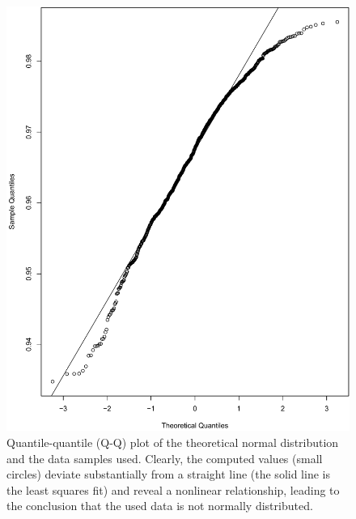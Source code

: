 \begin{figure}[ht]
	\begin{minipage}{0.65\textwidth}
	\includegraphics[width=\textwidth]{fig09}
	\end{minipage}
	\hspace{0.02\textwidth}
	\begin{minipage}{0.30\textwidth}
	\caption{Quantile-quantile (Q-Q) plot of the theoretical normal distribution and the data samples used. Clearly, the computed values (small circles) deviate substantially from a straight line (the solid line is the least squares fit) and reveal a nonlinear relationship, leading to the conclusion that the used data is not normally distributed.}
	\label{fig:normalityPlot}
	\end{minipage}
\end{figure}
